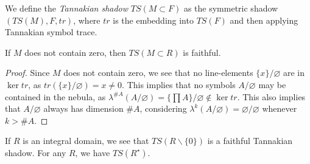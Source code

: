 \begin{definition}
  We define the \emph{Tannakian shadow} $TS(M \subset F)$ as the symmetric shadow $(TS(M), F, tr)$, where $tr$ is the embedding into $TS(F)$ and then applying Tannakian symbol trace. 
\end{definition}

\begin{proposition}
  If $M$ does not contain zero, then $TS(M \subset R)$ is faithful. 
\end{proposition}

\begin{proof}
  Since $M$ does not contain zero, we see that no line-elements $\{x\}/\varnothing$ are in $\ker tr$, as $tr(\{x\}/\varnothing) = x \ne 0$. This implies that no symbols $A/\varnothing$ may be contained in the nebula, as $\lambda^{\#A}(A/\varnothing) = \{\prod A\}/\varnothing \notin \ker tr$. This also implies that $A/\varnothing$ always has dimension $\#A$, considering $\lambda^k(A/\varnothing) = \varnothing/\varnothing$ whenever $k > \#A$.
  
  
\end{proof}

\begin{example}
  If $R$ is an integral domain, we see that $TS(R \backslash \{0\})$ is a faithful Tannakian shadow. For any $R$, we have $TS(R^{\star})$.
\end{example}
